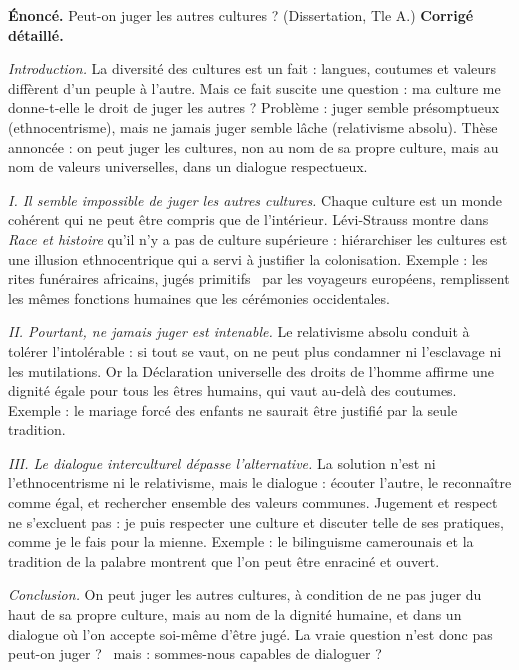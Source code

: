 \documentclass[11pt]{article}
\begin{document}
\begin{exoresolu}
\textbf{Énoncé.} Peut-on juger les autres cultures ? (Dissertation, Tle A.)
\tcblower
\textbf{Corrigé détaillé.}

\emph{Introduction.} La diversité des cultures est un fait : langues, coutumes et valeurs diffèrent d'un peuple à l'autre. Mais ce fait suscite une question : ma culture me donne-t-elle le droit de juger les autres ? Problème : juger semble présomptueux (ethnocentrisme), mais ne jamais juger semble lâche (relativisme absolu). Thèse annoncée : on peut juger les cultures, non au nom de sa propre culture, mais au nom de valeurs universelles, dans un dialogue respectueux.

\emph{I. Il semble impossible de juger les autres cultures.} Chaque culture est un monde cohérent qui ne peut être compris que de l'intérieur. Lévi-Strauss montre dans \emph{Race et histoire} qu'il n'y a pas de culture supérieure : hiérarchiser les cultures est une illusion ethnocentrique qui a servi à justifier la colonisation. Exemple : les rites funéraires africains, jugés \guillemotleft primitifs \guillemotright\ par les voyageurs européens, remplissent les mêmes fonctions humaines que les cérémonies occidentales.

\emph{II. Pourtant, ne jamais juger est intenable.} Le relativisme absolu conduit à tolérer l'intolérable : si tout se vaut, on ne peut plus condamner ni l'esclavage ni les mutilations. Or la Déclaration universelle des droits de l'homme affirme une dignité égale pour tous les êtres humains, qui vaut au-delà des coutumes. Exemple : le mariage forcé des enfants ne saurait être justifié par la seule tradition.

\emph{III. Le dialogue interculturel dépasse l'alternative.} La solution n'est ni l'ethnocentrisme ni le relativisme, mais le dialogue : écouter l'autre, le reconnaître comme égal, et rechercher ensemble des valeurs communes. Jugement et respect ne s'excluent pas : je puis respecter une culture et discuter telle de ses pratiques, comme je le fais pour la mienne. Exemple : le bilinguisme camerounais et la tradition de la palabre montrent que l'on peut être enraciné et ouvert.

\emph{Conclusion.} On peut juger les autres cultures, à condition de ne pas juger du haut de sa propre culture, mais au nom de la dignité humaine, et dans un dialogue où l'on accepte soi-même d'être jugé. La vraie question n'est donc pas \guillemotleft peut-on juger ? \guillemotright\ mais : \guillemotleft sommes-nous capables de dialoguer ? \guillemotright
\end{exoresolu}
\end{document}
